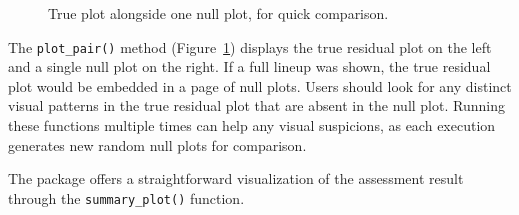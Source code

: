\documentclass[
doublespace,
  times]{anzsauth}
\newenvironment{Shaded}{\begin{snugshade}}{\end{snugshade}}
\newcommand{\FunctionTok}[1]{\textcolor[rgb]{0.28,0.35,0.67}{#1}}
\newcommand{\NormalTok}[1]{\textcolor[rgb]{0.00,0.23,0.31}{#1}}
\newcommand{\SpecialCharTok}[1]{\textcolor[rgb]{0.37,0.37,0.37}{#1}}
\begin{document}
\begin{figure}[H]


\caption{\label{fig-plot-pair}True plot alongside one null plot, for
quick comparison.}

\end{figure}%

The \texttt{plot\_pair()} method (Figure~\ref{fig-plot-pair}) displays
the true residual plot on the left and a single null plot on the right.
If a full lineup was shown, the true residual plot would be embedded in
a page of null plots. Users should look for any distinct visual patterns
in the true residual plot that are absent in the null plot. Running
these functions multiple times can help any visual suspicions, as each
execution generates new random null plots for comparison.

The package offers a straightforward visualization of the assessment
result through the \texttt{summary\_plot()} function.

\begin{Shaded}
\end{Shaded}
\end{document}
